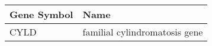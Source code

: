 \begin{tabular}{ll}
\toprule
Gene Symbol &                          Name \\
\midrule
       CYLD & familial cylindromatosis gene \\
\bottomrule
\end{tabular}
